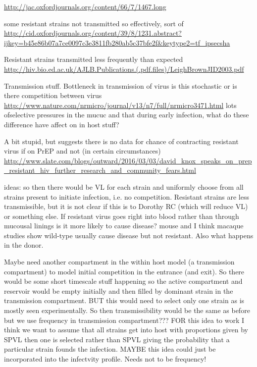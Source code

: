 \documentclass[DIV=15]{scrartcl}
\begin{document}
\url{http://jac.oxfordjournals.org/content/66/7/1467.long}



some resistant strains not transmitted so effectively, sort of
\url{http://cid.oxfordjournals.org/content/39/8/1231.abstract?ijkey=b45e86b07a7ce0097c3e3811fb280ab5c37bfe2f&keytype2=tf_ipsecsha}


Resistant strains transmitted  less frequently than expected
\url{http://hiv.bio.ed.ac.uk/AJLB.Publications.(.pdf.files)/LeighBrownJID2003.pdf}


Transmission stuff. Bottleneck in transmission of virus is this stochastic or is there competition between virus
\url{http://www.nature.com/nrmicro/journal/v13/n7/full/nrmicro3471.html}
lots ofselective pressures in the mucuc and that during early infection, what do these difference have affect on in host stuff?

A bit stupid, but suggests there is no data  for chance of contracting resistant virus if on PrEP and not (in certain circumstances) 
\url{http://www.slate.com/blogs/outward/2016/03/03/david_knox_speaks_on_prep_resistant_hiv_further_research_and_community_fears.html}


ideas: so then there would be VL for each strain and uniformly choose from all strains present to initiate infection, i.e. no competition. Resistant strains are less transmissible, but it is not clear if this is to Dorothy RC (which will reduce VL) or something else. If resistant virus goes right into blood rather than through mucousal linings is it more likely to cause disease? mouse and I think macaque studies show wild-type usually cause disease but not resistant. Also what happens in the donor. 

Maybe need another compartment in the within host model (a transmission compartment) to model initial competition in the entrance (and exit). So there would be some short timescale stuff happening so the active compartment and reservoir would be empty initially and then filled by dominant strain in the transmission compartment. BUT this would need to select only one strain as is mostly  seen  experimentally. So then transmissibility would be the same as before but we use frequency in transmission compartment???
FOR this idea to work I think we want to assume that all strains get into host with proportions given by SPVL then one is selected rather than SPVL giving the probability that a particular strain founds the infection. MAYBE this idea could just be incorporated into the  infectvity profile. Needs not to be frequency!
\end{document}
